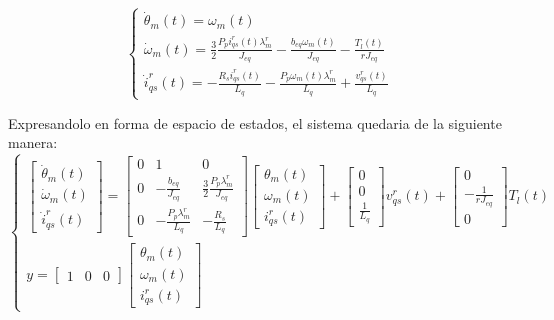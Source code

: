\documentclass[a4paper, 10pt, onecolumn,journal]{ieeeconf}
\begin{document}
\begin{equation}
	\begin{cases}
		\dot{\theta}_m(t) = {\omega}_m(t)\\
		\dot{\omega}_m(t) = \frac{3}{2} \frac{P_p i^r_{qs}(t)\lambda^r_m}{J_{eq}} - \frac{b_{eq}\omega_m(t)}{J_{eq}} - \frac{T_l(t)}{r J_{eq}}\\
		\dot{i}^r_{qs}(t) = -\frac{R_s i^r_{qs}(t)}{L_q} - \frac{P_p \omega_m(t) \lambda^r_m}{L_q}+ \frac{v^r_{qs}(t)}{L_q}
    \end{cases}
	\label{ecuacion con ids=0}
\end{equation}

Expresandolo en forma de espacio de estados, el sistema quedaria de la siguiente manera:
\begin{equation}
	\begin{cases}
		\begin{bmatrix}
			\dot{\theta}_m(t) \\ 
			\dot{\omega}_m(t)\\
			\dot{i}^r_{qs}(t)  
		\end{bmatrix}
		 = 
		 \begin{bmatrix}
		 	0 & 1 & 0\\ 
		 	0 & - \frac{b_{eq}}{J_{eq}} & \frac{3}{2} \frac{P_p \lambda^r_m}{J_{eq}}\\
		 	0 &  - \frac{P_p  \lambda^r_m}{L_q} & -\frac{R_s}{L_q}  
		 \end{bmatrix}
		 \begin{bmatrix}
		 	{\theta}_m(t) \\ 
		 	{\omega}_m(t)\\
		 	{i}^r_{qs}(t)  
		 \end{bmatrix}
		 +
		 \begin{bmatrix}
		 	0 \\ 
		 	0\\
		 	\frac{1}{L_q}  
		 \end{bmatrix}
		 v^r_{qs}(t)+
		 \begin{bmatrix}
		 	0 \\ 
		 	- \frac{1}{r J_{eq}}\\
		 	0 
		 \end{bmatrix}
		 T_l(t)\\
		 y = \begin{bmatrix}
		 		1 & 0 & 0
		 	 \end{bmatrix}
		 	 \begin{bmatrix}
		 	 	{\theta}_m(t) \\ 
		 	 	{\omega}_m(t)\\
		 	 	{i}^r_{qs}(t)
		 	 \end{bmatrix}
	\end{cases}
	\label{ecuacion con ids=0}
\end{equation}
\end{document}
